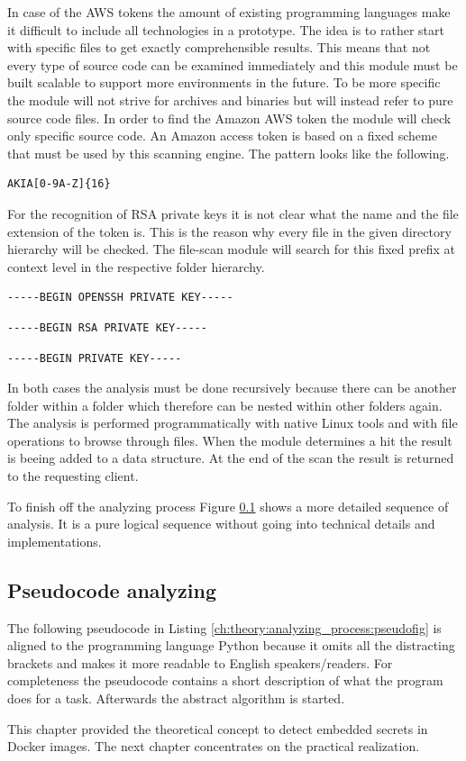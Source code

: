 In case of the AWS tokens the amount of existing programming languages make it difficult to include all technologies in a prototype. 
The idea is to rather start with specific files to get exactly comprehensible results. 
This means that not every type of source code can be examined immediately and this module must be built scalable to support more environments in the future.
To be more specific the module will not strive for archives and binaries but will instead refer to pure source code files.
In order to find the Amazon AWS token the module will check only specific source code.
An Amazon access token is based on a fixed scheme that must be used by this scanning engine.
The pattern looks like the following.
\begin{lstlisting}
AKIA[0-9A-Z]{16}
\end{lstlisting}

For the recognition of RSA private keys it is not clear what the name and the file extension of the token is.
This is the reason why every file in the given directory hierarchy will be checked.
The file-scan module will search for this fixed prefix at context level in the respective folder hierarchy.
\begin{lstlisting}
-----BEGIN OPENSSH PRIVATE KEY-----
\end{lstlisting}
\begin{lstlisting}
-----BEGIN RSA PRIVATE KEY-----
\end{lstlisting}
\begin{lstlisting}
-----BEGIN PRIVATE KEY-----
\end{lstlisting}

In both cases the analysis must be done recursively because there can be another folder within a folder which therefore can be nested within other folders again.
The analysis is performed programmatically with native Linux tools and with file operations to browse through files.
When the module determines a hit the result is beeing added to a data structure.
At the end of the scan the result is returned to the requesting client.

To finish off the analyzing process Figure \ref{ch:theory:analyzing_pseudocode} shows a more detailed sequence of analysis.
It is a pure logical sequence without going into technical details and implementations. 

\subsection{Pseudocode analyzing}
\label{ch:theory:analyzing_pseudocode}
The following pseudocode in Listing \ref{ch:theory:analyzing_process:pseudofig} is aligned to the programming language Python because it omits all the distracting brackets and makes it more readable to English speakers/readers.
For completeness the pseudocode contains a short description of what the program does for a task. 
Afterwards the abstract algorithm is started.

This chapter provided the theoretical concept to detect embedded secrets in Docker images. The next chapter concentrates on the practical realization.
